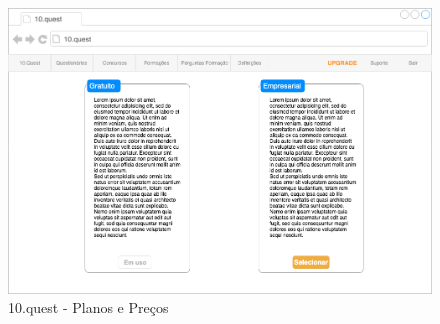 \begin{figure}[ht!]
	\begin{center}
		\includegraphics[width=1\textwidth]{img/prototipos/21.png}
		\caption{10.quest - Planos e Preços}
		\label{10q-}
	\end{center}
\end{figure}




